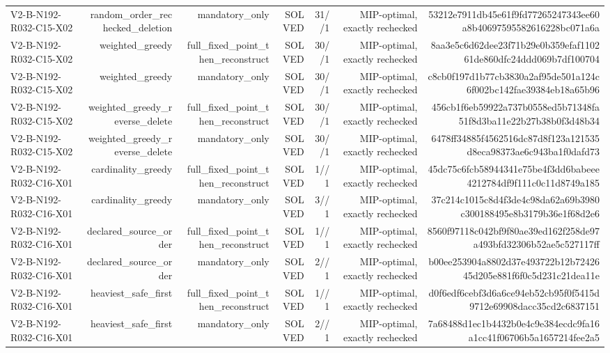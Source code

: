{\begin{longtable}{lrrrrrr}
V2-B-N192-R032-C15-X02 & random\_order\_rechecked\_deletion & mandatory\_only & SOLVED & 31//1 & MIP-optimal, exactly rechecked & 53212e7911db45e61f9fd77265247343ee60a8b40697595582616228bc071a6a \\
V2-B-N192-R032-C15-X02 & weighted\_greedy & full\_fixed\_point\_then\_reconstruct & SOLVED & 30//1 & MIP-optimal, exactly rechecked & 8aa3e5c6d62dee23f71b29e0b359efaf110261de860dfc24ddd069b7df100704 \\
V2-B-N192-R032-C15-X02 & weighted\_greedy & mandatory\_only & SOLVED & 30//1 & MIP-optimal, exactly rechecked & c8cb0f197d1b77cb3830a2af95de501a124c6f002bc142fae39384eb18a65b96 \\
V2-B-N192-R032-C15-X02 & weighted\_greedy\_reverse\_delete & full\_fixed\_point\_then\_reconstruct & SOLVED & 30//1 & MIP-optimal, exactly rechecked & 456cb1f6eb59922a737b0558ed5b71348fa51f8d3ba11e22b27b38b0f3d48b34 \\
V2-B-N192-R032-C15-X02 & weighted\_greedy\_reverse\_delete & mandatory\_only & SOLVED & 30//1 & MIP-optimal, exactly rechecked & 6478ff34885f4562516dc87d8f123a121535d8eca98373ae6c943ba1f0dafd73 \\
V2-B-N192-R032-C16-X01 & cardinality\_greedy & full\_fixed\_point\_then\_reconstruct & SOLVED & 1//1 & MIP-optimal, exactly rechecked & 45dc75c6fcb58944341e75be4f3dd6babeee4212784df9f111c0c11d8749a185 \\
V2-B-N192-R032-C16-X01 & cardinality\_greedy & mandatory\_only & SOLVED & 3//1 & MIP-optimal, exactly rechecked & 37c214c1015c8d4f3de4c98da62a69b3980c300188495e8b3179b36e1f68d2e6 \\
V2-B-N192-R032-C16-X01 & declared\_source\_order & full\_fixed\_point\_then\_reconstruct & SOLVED & 1//1 & MIP-optimal, exactly rechecked & 8560f97118c042bf9f80ae39ed162f258de97a493bfd32306b52ae5c527117ff \\
V2-B-N192-R032-C16-X01 & declared\_source\_order & mandatory\_only & SOLVED & 2//1 & MIP-optimal, exactly rechecked & b00ee253904a8802d37e493722b12b7242645d205e881f6f0c5d231c21dea11e \\
V2-B-N192-R032-C16-X01 & heaviest\_safe\_first & full\_fixed\_point\_then\_reconstruct & SOLVED & 1//1 & MIP-optimal, exactly rechecked & d0f6edf6cebf3d6a6ce94eb52cb95f0f5415d9712e69908dacc35cd2c6837151 \\
V2-B-N192-R032-C16-X01 & heaviest\_safe\_first & mandatory\_only & SOLVED & 2//1 & MIP-optimal, exactly rechecked & 7a68488d1ec1b4432b0e4c9e384ecdc9fa16a1cc41f06706b5a1657214fee2a5 \\

\end{longtable}}
